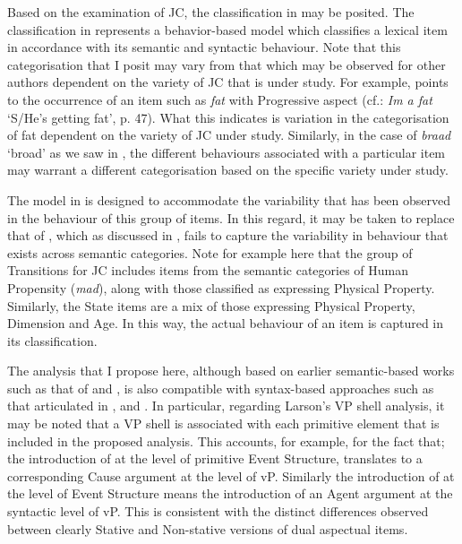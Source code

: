 Based on the examination of JC, the classification in  may be posited. The classification in  represents a behavior-based model which classifies a lexical item in accordance with its semantic and syntactic behaviour. Note that this categorisation that I posit may vary from that which may be observed for other authors dependent on the variety of JC that is under study. For example, \citet{Bailey1966} points to the occurrence of an item such as \textit{fat} with Progressive aspect (cf.: \textit{Im a fat} `S\slash He’s getting fat', p. 47). What this indicates is variation in the categorisation of fat dependent on the variety of JC under study. Similarly, in the case of \textit{braad} `broad' as we saw in , the different behaviours associated with a particular item may warrant a different categorisation based on the specific variety under study. 

The model in  is designed to accommodate the variability that has been observed in the behaviour of this group of items. In this regard, it may be taken to replace that of \citet{Winford1993}, which as discussed in , fails to capture the variability in behaviour that exists across semantic categories. Note for example here that the group of Transitions for JC includes items from the semantic categories of Human Propensity (\textit{mad}), along with those classified as expressing Physical Property. Similarly, the State items are a mix of those expressing Physical Property, Dimension and Age. In this way, the actual behaviour of an item is captured in its classification. 

The analysis that I propose here, although based on earlier semantic-based works such as that of \citet{Carter1976,McCawley1968,Dowty1979,Pustejovsky1988,Pustejovsky1991} and \citet{Grimshaw1990}, is also compatible with syntax-based approach\-es such as that articulated in \citet{Larson1988}, and \citet{Travis2010}. In particular, regarding Larson’s VP shell analysis, it may be noted that a VP shell is associated with each primitive element that is included in the proposed analysis. This accounts, for example, for the fact that; the introduction of \CAUSE at the level of primitive Event Structure, translates to a corresponding Cause argument at the level of vP. Similarly the introduction of \DO at the level of Event Structure means the introduction of an Agent argument at the syntactic level of vP. This is consistent with the distinct differences observed between clearly Stative and Non-stative versions of dual aspectual items. 

